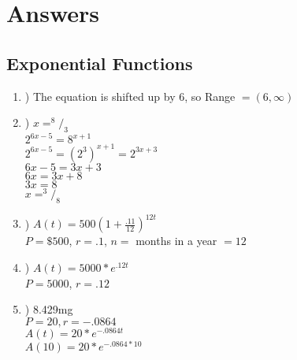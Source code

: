 \documentclass[fleqn]{article}
\newcommand\tab[1][1cm]{\hspace*{#1}}
\begin{document}
\clearpage

\section{Answers}
\subsection{Exponential Functions}
\renewcommand{\labelenumi}{\alph{enumi}}
\begin{enumerate}
    \item) The equation is shifted up by 6, so Range \(= (6, \infty)\)
    \item) \(x = ^8/_3\)\\
        \tab \(2^{6x-5} = 8^{x+1}\)\\
        \tab \(2^{6x-5} = (2^3)^{x+1} = 2^{3x+3}\)\\
        \tab \(6x-5 = 3x+3\)\\
        \tab \(6x = 3x+8\)\\
        \tab \(3x = 8\)\\
        \tab \(x = ^3/_8\)\\
    \item) \(A(t) = 500(1+\frac{.11}{12})^{12t}\)\\
        \tab \(P = \$500\), \(r = .1\), \(n =\) months in a year \(= 12\)
    \item) \(A(t) = 5000*e^{.12t}\)\\
        \tab \(P = 5000\), \(r = .12\)
    \item) 8.429mg\\
        \tab \(P = 20, r = -.0864\)\\
        \tab \(A(t) = 20*e^{-.0864t}\)\\
        \tab \(A(10) = 20*e^{-.0864*10}\)
\end{enumerate}
\end{document}
